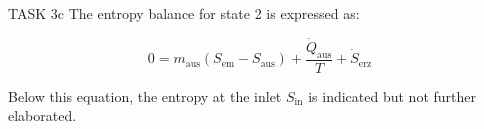 TASK 3c  
The entropy balance for state 2 is expressed as:  

\[
0 = m_{\text{aus}} \left( S_{\text{em}} - S_{\text{aus}} \right) + \frac{\dot{Q}_{\text{aus}}}{T} + \dot{S}_{\text{erz}}
\]

Below this equation, the entropy at the inlet \( S_{\text{in}} \) is indicated but not further elaborated.